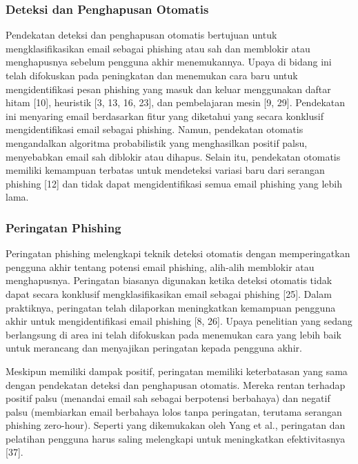 \documentclass[lettersize,journal]{IEEEtran}
\begin{document}
\subsubsection{Deteksi dan Penghapusan Otomatis}
Pendekatan deteksi dan penghapusan otomatis bertujuan untuk mengklasifikasikan email sebagai phishing atau sah dan memblokir atau menghapusnya sebelum pengguna akhir menemukannya. Upaya di bidang ini telah difokuskan pada peningkatan dan menemukan cara baru untuk mengidentifikasi pesan phishing yang masuk dan keluar menggunakan daftar hitam [10], heuristik [3, 13, 16, 23], dan pembelajaran mesin [9, 29]. Pendekatan ini menyaring email berdasarkan fitur yang diketahui yang secara konklusif mengidentifikasi email sebagai phishing. Namun, pendekatan otomatis mengandalkan algoritma probabilistik yang menghasilkan positif palsu, menyebabkan email sah diblokir atau dihapus. Selain itu, pendekatan otomatis memiliki kemampuan terbatas untuk mendeteksi variasi baru dari serangan phishing [12] dan tidak dapat mengidentifikasi semua email phishing yang lebih lama.

\subsubsection{Peringatan Phishing}
Peringatan phishing melengkapi teknik deteksi otomatis dengan memperingatkan pengguna akhir tentang potensi email phishing, alih-alih memblokir atau menghapusnya. Peringatan biasanya digunakan ketika deteksi otomatis tidak dapat secara konklusif mengklasifikasikan email sebagai phishing [25]. Dalam praktiknya, peringatan telah dilaporkan meningkatkan kemampuan pengguna akhir untuk mengidentifikasi email phishing [8, 26]. Upaya penelitian yang sedang berlangsung di area ini telah difokuskan pada menemukan cara yang lebih baik untuk merancang dan menyajikan peringatan kepada pengguna akhir.

Meskipun memiliki dampak positif, peringatan memiliki keterbatasan yang sama dengan pendekatan deteksi dan penghapusan otomatis. Mereka rentan terhadap positif palsu (menandai email sah sebagai berpotensi berbahaya) dan negatif palsu (membiarkan email berbahaya lolos tanpa peringatan, terutama serangan phishing zero-hour). Seperti yang dikemukakan oleh Yang et al., peringatan dan pelatihan pengguna harus saling melengkapi untuk meningkatkan efektivitasnya [37].
\end{document}
